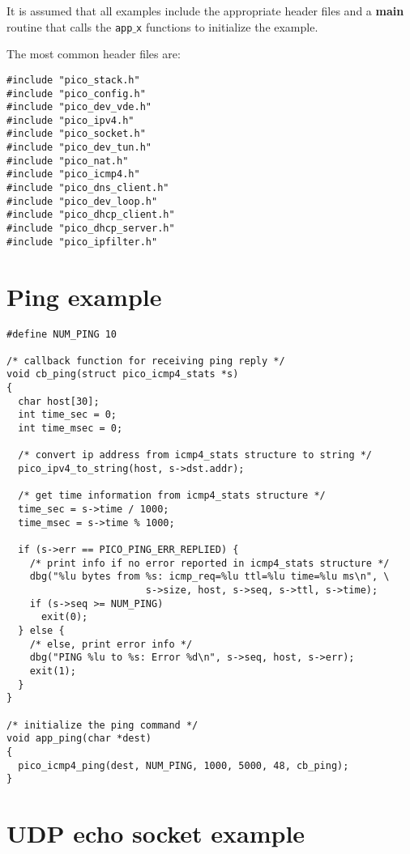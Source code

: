It is assumed that all examples include the appropriate header files
and a \textbf{main} routine that calls the \texttt{app$\_$x} functions to initialize
the example.

The most common header files are:
\begin{verbatim}
#include "pico_stack.h"
#include "pico_config.h"
#include "pico_dev_vde.h"
#include "pico_ipv4.h"
#include "pico_socket.h"
#include "pico_dev_tun.h"
#include "pico_nat.h"
#include "pico_icmp4.h"
#include "pico_dns_client.h"
#include "pico_dev_loop.h"
#include "pico_dhcp_client.h"
#include "pico_dhcp_server.h"
#include "pico_ipfilter.h"
\end{verbatim}

\section{Ping example}

\begin{verbatim}
#define NUM_PING 10

/* callback function for receiving ping reply */
void cb_ping(struct pico_icmp4_stats *s)
{
  char host[30];
  int time_sec = 0;
  int time_msec = 0;
  
  /* convert ip address from icmp4_stats structure to string */
  pico_ipv4_to_string(host, s->dst.addr);
  
  /* get time information from icmp4_stats structure */
  time_sec = s->time / 1000;
  time_msec = s->time % 1000;
  
  if (s->err == PICO_PING_ERR_REPLIED) {
  	/* print info if no error reported in icmp4_stats structure */
    dbg("%lu bytes from %s: icmp_req=%lu ttl=%lu time=%lu ms\n", \
    					s->size, host, s->seq, s->ttl, s->time);
    if (s->seq >= NUM_PING)
      exit(0);
  } else {
  	/* else, print error info */
    dbg("PING %lu to %s: Error %d\n", s->seq, host, s->err);
    exit(1);
  }
}

/* initialize the ping command */
void app_ping(char *dest)
{
  pico_icmp4_ping(dest, NUM_PING, 1000, 5000, 48, cb_ping);
}
\end{verbatim}


\section{UDP echo socket example}

